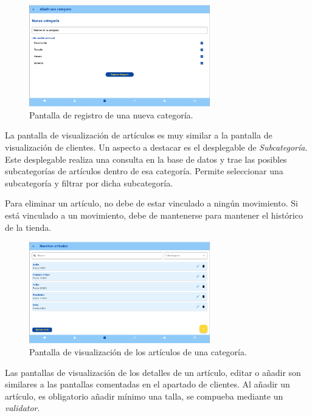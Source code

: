 \begin{figure}[H]
	\centering
	\includegraphics[width=0.7\textwidth]{imagenes/TerceraIteracion/newCategory.png}
	\caption{Pantalla de registro de una nueva categoría.}
\end{figure}

La pantalla de visualización de artículos es muy similar a la pantalla de visualización de clientes. Un aspecto a destacar es el desplegable de \textit{Subcategoría}. Este desplegable realiza una consulta en la base de datos y trae las posibles subcategorías de artículos dentro de esa categoría. Permite seleccionar una subcategoría y filtrar por dicha subcategoría. 

Para eliminar un artículo, no debe de estar vinculado a ningún movimiento. Si está vinculado a un movimiento, debe de mantenerse para mantener el histórico de la tienda. 

\begin{figure}[H]
	\centering
	\includegraphics[width=0.7\textwidth]{imagenes/TerceraIteracion/articleView.png}
	\caption{Pantalla de visualización de los artículos de una categoría.}
\end{figure}

Las pantallas de visualización de los detalles de un artículo, editar o añadir son similares a las pantallas comentadas en el apartado de clientes. Al añadir un artículo, es obligatorio añadir mínimo una talla, se compueba mediante un \textit{validator}. 

